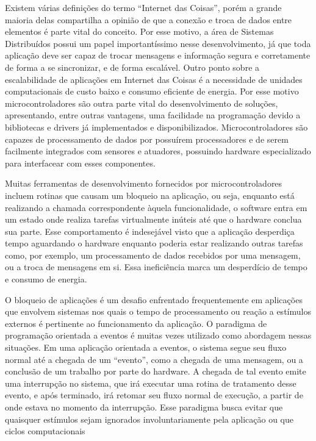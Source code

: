 \documentclass{article}
\begin{document}
\tab Existem várias definições do termo “Internet das
Coisas”, porém a grande maioria delas compartilha a opinião de que a conexão e troca de dados
entre elementos é parte vital do conceito. Por esse motivo, a área de Sistemas Distribuídos possui um
papel importantíssimo nesse desenvolvimento, já que toda aplicação deve ser capaz de trocar
mensagens e informação segura e corretamente de forma a se sincronizar, e de forma escalável. \cite{singh2014}
Outro ponto sobre a escalabilidade de aplicações em Internet das Coisas é a necessidade de unidades
computacionais de custo baixo e consumo eficiente de energia. Por esse motivo microcontroladores
são outra parte vital do desenvolvimento de soluções, apresentando, entre outras vantagens, uma
facilidade na programação devido a bibliotecas e drivers já implementados e disponibilizados.
Microcontroladores são capazes de processamento de dados por possuírem processadores e de
serem facilmente integrados com sensores e atuadores, possuindo hardware especializado para
interfacear com esses componentes.
\par Muitas ferramentas de desenvolvimento fornecidos por microcontroladores incluem rotinas que causam um bloqueio na
aplicação, ou seja, enquanto está realizando a chamada correspondente àquela funcionalidade, o
software entra em um estado onde realiza tarefas virtualmente inúteis até que o hardware conclua sua
parte. Esse comportamento é indesejável visto que a aplicação desperdiça tempo aguardando o
hardware enquanto poderia estar realizando outras tarefas como, por exemplo, um processamento de
dados recebidos por uma mensagem, ou a troca de mensagens em si. Essa ineficiência marca um
desperdício de tempo e consumo de energia.
\par O bloqueio de aplicações é um desafio enfrentado frequentemente em aplicações que envolvem
sistemas nos quais o tempo de processamento ou reação a estímulos externos é pertinente ao
funcionamento da aplicação. O paradigma de programação orientada a eventos é muitas vezes
utilizado como abordagem nessas situações. Em uma aplicação orientada a eventos, o sistema segue
seu fluxo normal até a chegada de um “evento”, como a chegada de uma mensagem, ou a conclusão
de um trabalho por parte do hardware. A chegada de tal evento emite uma interrupção no sistema, que
irá executar uma rotina de tratamento desse evento, e após terminado, irá retomar seu fluxo normal
de execução, a partir de onde estava no momento da interrupção. Esse paradigma busca evitar que
quaisquer estímulos sejam ignorados involuntariamente pela aplicação ou que ciclos computacionais
\end{document}
